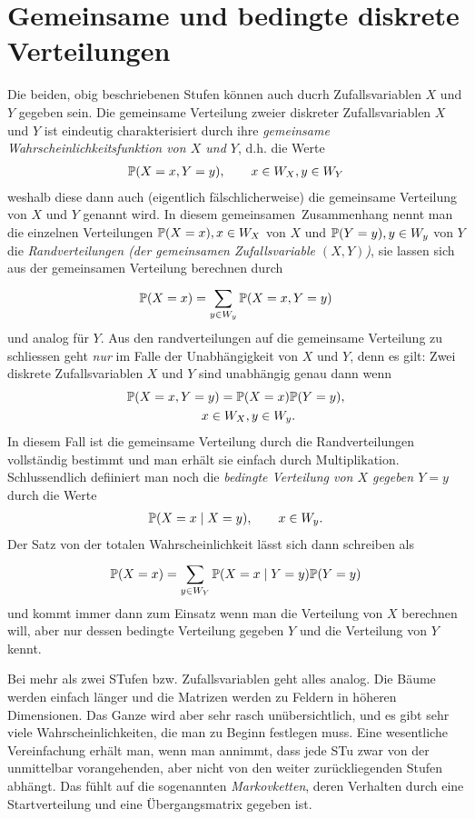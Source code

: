 \section{Gemeinsame und bedingte diskrete Verteilungen}
Die beiden, obig beschriebenen Stufen können auch ducrh Zufallsvariablen $X$ und $Y$ gegeben sein. Die gemeinsame Verteilung zweier diskreter Zufallsvariablen $X$ und $Y$ ist eindeutig charakterisiert durch ihre \emph{gemeinsame Wahrscheinlichkeitsfunktion von $X$ und $Y$}, d.h. die Werte
\begin{gather*}
	\mathbb P(X=x,Y=y), \qquad x\in W_{X}, y\in W_{Y}
\end{gather*}
	weshalb diese dann auch (eigentlich fälschlicherweise) die gemeinsame Verteilung von $X$ und $Y$ genannt wird. In diesem \glqq gemeinsamen\grqq\ Zusammenhang nennt man die einzelnen Verteilungen $\mathbb P(X=x), x\in W_X$ von $X$ und $\mathbb P(Y=y), y\in W_y$ von $Y$ die \emph{Randverteilungen (der gemeinsamen Zufallsvariable $(X,Y)$)}, sie lassen sich aus der gemeinsamen Verteilung berechnen durch
\begin{gather*}
	\mathbb P(X=x)=\sum_{y\in W_y}^{}\mathbb P(X=x,Y=y)
\end{gather*}
und analog für $Y$. Aus den randverteilungen auf die gemeinsame Verteilung zu schliessen geht \emph{nur} im Falle der Unabhängigkeit von $X$ und $Y$, denn es gilt: Zwei diskrete Zufallsvariablen $X$ und $Y$ sind unabhängig genau dann wenn
\begin{gather*}
	\mathbb P(X=x,Y=y)=\mathbb P(X=x)\mathbb P(Y=y),\\\qquad x\in W_X,y\in W_y.
\end{gather*}
In diesem Fall ist die gemeinsame Verteilung durch die Randverteilungen vollständig bestimmt und man erhält sie einfach durch Multiplikation. Schlussendlich defiiniert man noch die \emph{bedingte Verteilung von $X$ gegeben $Y=y$} durch die Werte
\begin{gather*}
	\mathbb P(X=x\mid X=y),\qquad x\in W_{y}.
\end{gather*}
Der Satz von der totalen Wahrscheinlichkeit lässt sich dann schreiben als
\begin{gather*}
	\mathbb P(X=x)=\sum_{y\in W_{Y}}^{}\mathbb P(X=x\mid Y=y)\mathbb P(Y=y)
\end{gather*}
und kommt immer dann zum Einsatz wenn man die Verteilung von $X$ berechnen will, aber nur dessen bedingte Verteilung gegeben $Y$ und die Verteilung von $Y$ kennt.

Bei mehr als zwei STufen bzw. Zufallsvariablen geht alles analog. Die Bäume werden einfach länger und die Matrizen werden zu Feldern in höheren Dimensionen. Das Ganze wird aber sehr rasch unübersichtlich, und es gibt sehr viele Wahrscheinlichkeiten, die man zu Beginn festlegen muss. Eine wesentliche Vereinfachung erhält man, wenn man annimmt, dass jede STu zwar von der unmittelbar vorangehenden, aber nicht von den weiter zurückliegenden Stufen abhängt. Das fühlt auf die sogenannten \emph{Markovketten}, deren Verhalten durch eine Startverteilung und eine Übergangsmatrix gegeben ist.
